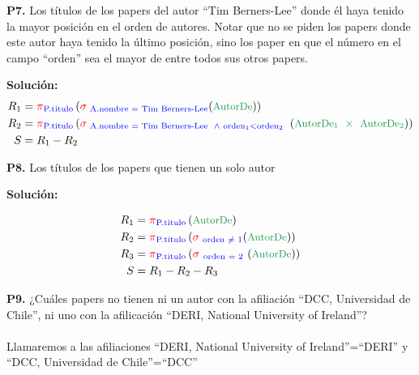 \documentclass[letterpaper,11pt]{article}
\begin{document}
\textbf{P7.} Los títulos de los papers del autor “Tim Berners-Lee” donde él haya tenido la mayor posición en el orden de autores. Notar que no se piden los papers donde este autor haya tenido la último posición, sino los paper en que el número en el campo “orden” sea el mayor de entre todos sus otros papers.

\textbf{Solución:}
{\large
\begin{align*}
 R_1 &= \textcolor{red}{\pi}_{\textcolor{blue}{\textrm{P.titulo}}} \left(\textcolor{red}{\sigma}_{\textrm{\textcolor{blue}{\ A.nombre = Tim Berners-Lee}}} (\textcolor{ForestGreen}{\textrm{\small AutorDe}})  \right) \\
 R_2 &= \textcolor{red}{\pi}_{\textcolor{blue}{\textrm{P.titulo}}} \left(\textcolor{red}{\sigma}_{\textrm{\textcolor{blue}{\ A.nombre = Tim Berners-Lee \ $\wedge$\ orden$_1$$<$orden$_2$ \ }} } (\textcolor{ForestGreen}{\textrm{\small AutorDe$_1$}\ \times \ \textrm{\small AutorDe$_2$}})  \right) \\
 S &= R_1 - R_2
\end{align*}
}

\textbf{P8.} Los títulos de los papers que tienen un solo autor

\textbf{Solución:}

{\large
\begin{align*}
 R_1 &= \textcolor{red}{\pi}_{\textcolor{blue}{\textrm{P.titulo}}} \left( \textrm{{\small \textcolor{ForestGreen}{AutorDe}}} \right)  \\
 R_2 &= \textcolor{red}{\pi}_{\textcolor{blue}{\textrm{P.titulo}}} \left(\textcolor{red}{\sigma}_{\textcolor{blue}{\textrm{\  orden $\neq$ 1}} } (\textrm{\small \textcolor{ForestGreen}{AutorDe}})  \right)\\
    R_3 &= \textcolor{red}{\pi}_{\textcolor{blue}{\textrm{P.titulo}}} \left(\textcolor{red}{\sigma}_{\textcolor{blue}{\ \textrm{orden $=$ 2}\ }} (\textcolor{ForestGreen}{\textrm{{\small AutorDe}}}) \right)\\
 S &= R_1 - R_2 -R_3
\end{align*}
}

\textbf{P9.} ¿Cuáles papers no tienen ni un autor con la afiliación “DCC, Universidad de Chile”, ni uno con la afilicación “DERI, National University of Ireland”?\\
\\
Llamaremos a las afiliaciones “DERI, National University of Ireland”=``DERI'' y “DCC, Universidad de Chile”=``DCC''
\\
\end{document}

